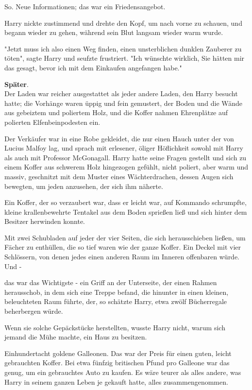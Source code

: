 {So. Neue Informationen; das war ein Friedensangebot.

Harry nickte zustimmend und drehte den Kopf, um nach vorne zu schauen, und begann wieder zu gehen, während sein Blut langsam wieder warm wurde.

"Jetzt muss ich also einen Weg finden, einen unsterblichen dunklen Zauberer zu töten", sagte Harry und seufzte frustriert. "Ich wünschte wirklich, Sie hätten mir das gesagt, bevor ich mit dem Einkaufen angefangen habe."

\textbf{Später}.\\ Der Laden war reicher ausgestattet als jeder andere Laden, den Harry besucht hatte; die Vorhänge waren üppig und fein gemustert, der Boden und die Wände aus gebeiztem und poliertem Holz, und die Koffer nahmen Ehrenplätze auf polierten Elfenbeinpodesten ein.

Der Verkäufer war in eine Robe gekleidet, die nur einen Hauch unter der von Lucius Malfoy lag, und sprach mit erlesener, öliger Höflichkeit sowohl mit Harry als auch mit Professor McGonagall. Harry hatte seine Fragen gestellt und sich zu einem Koffer aus schwerem Holz hingezogen gefühlt, nicht poliert, aber warm und massiv, geschnitzt mit dem Muster eines Wächterdrachen, dessen Augen sich bewegten, um jeden anzusehen, der sich ihm näherte.

Ein Koffer, der so verzaubert war, dass er leicht war, auf Kommando schrumpfte, kleine krallenbewehrte Tentakel aus dem Boden sprießen ließ und sich hinter dem Besitzer herwinden konnte.

Mit zwei Schubladen auf jeder der vier Seiten, die sich herausschieben ließen, um Fächer zu enthüllen, die so tief waren wie der ganze Koffer. Ein Deckel mit vier Schlössern, von denen jedes einen anderen Raum im Inneren offenbaren würde. Und -

das war das Wichtigste - ein Griff an der Unterseite, der einen Rahmen herausschob, in dem sich eine Treppe befand, die hinunter in einen kleinen, beleuchteten Raum führte, der, so schätzte Harry, etwa zwölf Bücherregale beherbergen würde.

Wenn sie solche Gepäckstücke herstellten, wusste Harry nicht, warum sich jemand die Mühe machte, ein Haus zu besitzen.

Einhundertacht goldene Galleonen. Das war der Preis für einen guten, leicht gebrauchten Koffer. Bei etwa fünfzig britischen Pfund pro Galleone war das genug, um ein gebrauchtes Auto zu kaufen. Es wäre teurer als alles andere, was Harry in seinem ganzen Leben je gekauft hatte, alles zusammengenommen.

}
